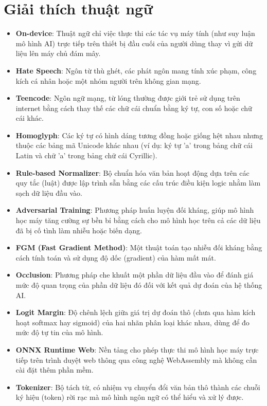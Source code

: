 \documentclass[12pt,a4paper]{article}
\begin{document}
\section*{Giải thích thuật ngữ}
\begin{itemize}
    \item \textbf{On-device}: Thuật ngữ chỉ việc thực thi các tác vụ máy tính (như suy luận mô hình AI) trực tiếp trên thiết bị đầu cuối của người dùng thay vì gửi dữ liệu lên máy chủ đám mây.
    \item \textbf{Hate Speech}: Ngôn từ thù ghét, các phát ngôn mang tính xúc phạm, công kích cá nhân hoặc một nhóm người trên không gian mạng.
    \item \textbf{Teencode}: Ngôn ngữ mạng, từ lóng thường được giới trẻ sử dụng trên internet bằng cách thay thế các chữ cái chuẩn bằng ký tự, con số hoặc chữ cái khác.
    \item \textbf{Homoglyph}: Các ký tự có hình dáng tương đồng hoặc giống hệt nhau nhưng thuộc các bảng mã Unicode khác nhau (ví dụ: ký tự 'a' trong bảng chữ cái Latin và chữ 'a' trong bảng chữ cái Cyrillic).
    \item \textbf{Rule-based Normalizer}: Bộ chuẩn hóa văn bản hoạt động dựa trên các quy tắc (luật) được lập trình sẵn bằng các cấu trúc điều kiện logic nhằm làm sạch dữ liệu đầu vào.
    \item \textbf{Adversarial Training}: Phương pháp huấn luyện đối kháng, giúp mô hình học máy tăng cường sự bền bỉ bằng cách cho mô hình học trên cả các dữ liệu đã bị cố tình làm nhiễu hoặc biến dạng.
    \item \textbf{FGM (Fast Gradient Method)}: Một thuật toán tạo nhiễu đối kháng bằng cách tính toán và sử dụng độ dốc (gradient) của hàm mất mát.
    \item \textbf{Occlusion}: Phương pháp che khuất một phần dữ liệu đầu vào để đánh giá mức độ quan trọng của phần dữ liệu đó đối với kết quả dự đoán của hệ thống AI.
    \item \textbf{Logit Margin}: Độ chênh lệch giữa giá trị dự đoán thô (chưa qua hàm kích hoạt softmax hay sigmoid) của hai nhãn phân loại khác nhau, dùng để đo mức độ tự tin của mô hình.
    \item \textbf{ONNX Runtime Web}: Nền tảng cho phép thực thi mô hình học máy trực tiếp trên trình duyệt web thông qua công nghệ WebAssembly mà không cần cài đặt thêm phần mềm.
    \item \textbf{Tokenizer}: Bộ tách từ, có nhiệm vụ chuyển đổi văn bản thô thành các chuỗi ký hiệu (token) rời rạc mà mô hình ngôn ngữ có thể hiểu và xử lý được.
\end{itemize}
\end{document}

